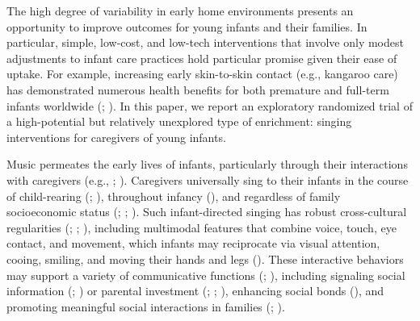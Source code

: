 \documentclass[
]{article}
\begin{document}
The high degree of variability in early home environments presents an
opportunity to improve outcomes for young infants and their families. In
particular, simple, low-cost, and low-tech interventions that involve
only modest adjustments to infant care practices hold particular promise
given their ease of uptake. For example, increasing early skin-to-skin
contact (e.g., kangaroo care) has demonstrated numerous health benefits
for both premature and full-term infants worldwide
(;
). In this paper, we report
an exploratory randomized trial of a high-potential but relatively
unexplored type of enrichment: singing interventions for caregivers of
young infants.

Music permeates the early lives of infants, particularly through their
interactions with caregivers (e.g., ; ).
Caregivers universally sing to their infants in the course of
child-rearing (;
), throughout infancy
(), and regardless of family
socioeconomic status (;
;
). Such
infant-directed singing has robust cross-cultural regularities
(;
;
), including multimodal
features that combine voice, touch, eye contact, and movement, which
infants may reciprocate via visual attention, cooing, smiling, and
moving their hands and legs (). These interactive behaviors may support a variety of
communicative functions (; ),
including signaling social information (; ) or parental
investment (;
;
), enhancing social bonds
(), and
promoting meaningful social interactions in families
(;
).
\end{document}
